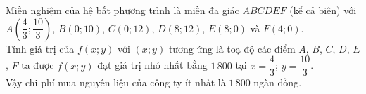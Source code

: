 \begin{bt}
{\begin{center}
		\end{center}
		Miền nghiệm của hệ bất phương trình là miền đa giác $ABCDEF$ (kể cả biên) với $A\left(\dfrac{4}{3};\dfrac{10}{3}\right)$, $B(0;10)$, $C(0;12)$, $D(8;12)$, $E(8;0)$ và $F(4;0)$.\\
		Tính giá trị của $f(x;y)$ với $(x;y)$ tương ứng là toạ độ các điểm $A$, $B$, $C$, $D$, $E$, $F$ ta được $f(x;y)$ đạt giá trị nhó nhất bằng $1\,800$ tại $x=\dfrac{4}{3}$; $y=\dfrac{10}{3}$.\\
		Vậy chi phí mua nguyên liệu của công ty ít nhất là $1\,800$ ngàn đồng.
	}
\end{bt}

